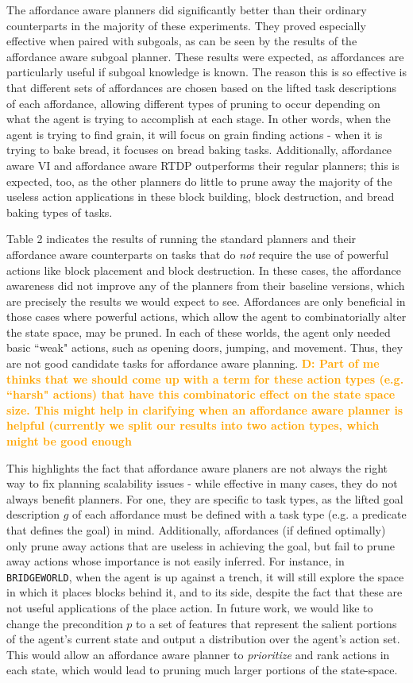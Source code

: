 \documentclass[]{article}
\newcommand{\dnote}[1]{\textcolor{Orange}{\textbf{D: #1}}}
\begin{document}
The affordance aware planners did significantly better than their ordinary counterparts in the majority
of these experiments. They proved especially effective when paired with subgoals, as can be seen by the
results of the affordance aware subgoal planner. These results were expected, as affordances are particularly
useful if subgoal knowledge is known. The reason this is so effective is that different sets
of affordances are chosen based on the lifted task descriptions of each affordance, allowing different types
of pruning to occur depending on what the agent is trying to accomplish at each stage. In other words, when the agent
is trying to find grain, it will focus on grain finding actions - when it is trying to bake bread, it focuses on bread baking tasks.
Additionally, affordance aware VI and affordance aware RTDP outperforms their regular planners; this is expected, too, as the other
planners do little to prune away the majority of the useless action applications in these block building,
block destruction, and bread baking types of tasks.

Table 2 indicates the results of running the standard planners and their affordance aware counterparts
on tasks that do {\it not} require the use of powerful actions like block placement and block destruction.
In these cases, the affordance awareness did not improve any of the planners from their baseline versions, which are precisely the results we would expect to see. Affordances are only beneficial in those cases
where powerful actions, which allow the agent to combinatorially alter the state space, may be pruned. In each of these worlds, the agent only needed basic ``weak" actions,
such as opening doors, jumping, and movement. Thus, they are not good candidate tasks for affordance
aware planning.
\dnote{Part of me thinks that we should come up with a term for these action types (e.g. ``harsh" actions) that have this combinatoric effect on the state space size. This might help in clarifying when an affordance aware planner is helpful (currently we split our results into two action types, which might be good enough}


This highlights the fact that affordance aware planers are not always the right way to fix planning scalability issues - while effective in many cases, they do not always benefit planners. For one, they are specific to task types, as the lifted goal description $g$ of each affordance must be defined with a task type (e.g. a predicate that defines the goal) in mind. Additionally, affordances (if defined optimally) 
only prune away actions that are useless in achieving the goal, 
but fail to prune away actions whose importance is not easily inferred. For instance,
in \texttt{BRIDGEWORLD}, when the agent is up against a trench, it will still explore the space in which it places
blocks behind it, and to its side, despite the fact that these are not useful applications of the place action. In future
work, we would like to change the precondition $p$ to a set of features that represent the salient portions of the agent's
current state and output a distribution over the agent's action set. This would allow an affordance
aware planner to {\it prioritize} and rank actions in each state, which would lead to pruning much larger portions of the state-space.
\end{document}
